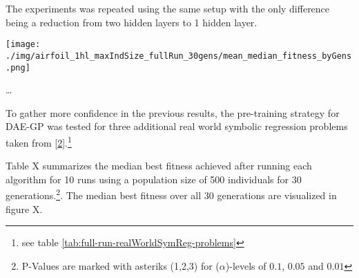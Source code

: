 \documentclass[
  11pt,
]{article}
\let\origfigure\figure
\let\endorigfigure\endfigure
\renewenvironment{figure}[1][2] {
    \expandafter\origfigure\expandafter[H]
} {
    \endorigfigure
}
\begin{document}
The experiments was repeated using the same setup with the only difference being a reduction from two hidden layers to 1 hidden layer.

\begin{figure}
\centering
\texttt{[image: ./img/airfoil\_1hl\_maxIndSize\_fullRun\_30gens/mean\_median\_fitness\_byGens.png]}
\caption{Best Fitness over 30 Generations - 1 hidden Layer - Airfoil}
\end{figure}

\ldots{}

To gather more confidence in the previous results, the pre-training strategy for DAE-GP was tested for three additional real world symbolic regression problems taken from {[}\protect\hyperlink{ref-machine_learning_repo}{2}{]}.\footnote{see table \ref{tab:full-run-realWorldSymReg-problems}}

Table X summarizes the median best fitness achieved after running each algorithm for 10 runs using a population size of 500 individuals for 30 generations.\footnote{P-Values are marked with asteriks (1,2,3) for (\(\alpha\))-levels of \(0.1\), \(0.05\) and \(0.01\)}. The median best fitness over all 30 generations are visualized in figure X.
\end{document}

